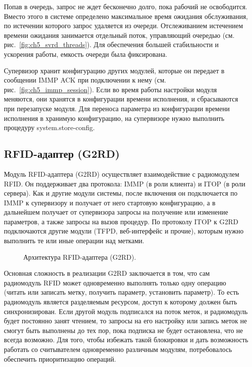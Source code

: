 Попав в очередь, запрос не ждет бесконечно долго, пока рабочий не освободится. Вместо этого в системе определено максимальное время ожидания обслуживания, по истечении которого запрос удаляется из очереди. Отслеживанием истечением времени ожидания занимается отдельный поток, управляющий очередью (см. рис.~\ref{fig:ch5_svrd_threads}). Для обеспечения большей стабильности и ускорения работы, емкость очереди была фиксирована.

Супервизор хранит конфигурацию других модулей, которые он передает в сообщении IMMP ACK при подключении к нему (см. рис.~\ref{fig:ch5_immp_session}). Если во время работы настройки модуля меняются, они хранятся в конфигурации времени исполнения, и сбрасываются при перезапуске модуля. Для переноса параметра из конфигурации времени исполнения в хранимую конфигурацию, на супервизоре нужно выполнить процедуру system.store-config.


\subsection{RFID-адаптер (G2RD)}\label{sec:ch5_components_g2rd}

Модуль RFID-адаптера (G2RD) осуществляет взаимодействие с радиомодулем RFID. Он поддерживает два протокола: IMMP (в роли клиента) и ITOP (в роли сервера). Как и другие модули системы, после включения он подключается по IMMP к супервизору и получает от него стартовую конфигурацию, а в дальнейшем получает от супервизора запросы на получение или изменение параметров, а также запросы на вызов процедур. По протоколу ITOP к G2RD подключаются другие модули (TFPD, веб-интерфейс и прочие), которым нужно выполнить те или иные операции над метками.

\begin{figure}[ht]
  \caption{Архитектура RFID-адаптера (G2RD).}
  \label{fig:ch5_g2rd_threads}
\end{figure}

Основная сложность в реализации G2RD заключается в том, что сам радиомодуль RFID может одновременно выполнять только одну операцию (читать или записать метку, получить параметр, установить параметр). То есть радиомодуль является разделяемым ресурсом, доступ к которому должен быть синхронизирован. Если другой модуль подписался на поток меток, и радиомодуль будет постоянно занят чтением, то запросы на его настройку или запись меток не смогут быть выполнены до тех пор, пока подписка не будет остановлена, что не всегда возможно. Для того, чтобы избежать такой блокировки и дать возможность работать со считывателем одновременно различным модулям, потребовалось обеспечить приоритизацию операций.

